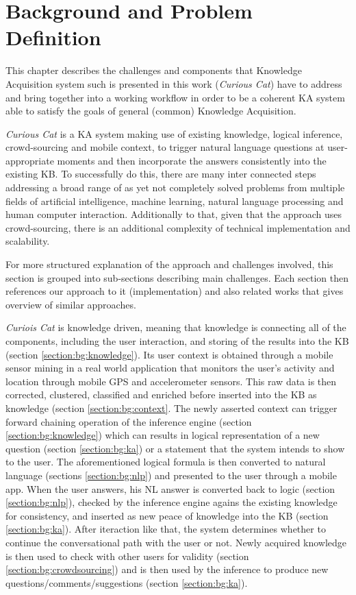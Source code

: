 %
\chapter{Background and Problem Definition}
\label{chapter:background}
This chapter describes the challenges and components that Knowledge Acquisition 
system such is presented in this work (\emph{Curious Cat}) have to address and 
bring together into a working workflow in order to be a coherent KA system able 
to satisfy the goals of general (common) Knowledge Acquisition. 

\emph{Curious Cat} is a KA system making use of existing knowledge, 
logical inference, crowd-sourcing and mobile context, to trigger natural language
questions at user-appropriate moments and then incorporate the answers consistently
into the existing KB. To successfully do this, there are many inter connected
steps addressing a broad range of as yet not completely solved problems from
multiple fields of artificial intelligence, machine learning, natural language
processing and human computer interaction. Additionally to that, given
that the approach uses crowd-sourcing, there is an additional complexity
of technical implementation and scalability. 

For more structured explanation of the approach and challenges involved, this
section is grouped into sub-sections describing main challenges. Each section
then references our approach to it (implementation) and also related works that
gives overview of similar approaches.

\emph{Curiois Cat} is knowledge driven, meaning that knowledge is connecting
all of the components, including the user interaction, and storing of the
results into the KB (section \ref{section:bg:knowledge}). Its user context is 
obtained through a mobile sensor mining in a real world application that 
monitors the user’s activity and location through mobile GPS and accelerometer 
sensors. This raw data is then corrected, clustered, classified and enriched 
before inserted into the KB as knowledge (section \ref{section:bg:context}.
The newly asserted context can trigger forward chaining operation of the 
inference engine (section \ref{section:bg:knowledge}) which can results in
logical representation of a new question (section \ref{section:bg:ka}) or a 
statement that the system intends to show to the user. The aforementioned  
logical formula is then converted to natural language (sections 
\ref{section:bg:nlp}) and presented to the user through a mobile app. 
When the user answers, his NL answer is converted back to logic 
(section \ref{section:bg:nlp}), checked by the inference engine agains the 
existing knowledge for consistency, and inserted as new peace of knowledge into 
the KB (section \ref{section:bg:ka}). After iteraction like that, the
system determines whether to continue the conversational path with the user or
 not. Newly acquired knowledge is then used to check with other users for
validity (section \ref{section:bg:crowdsourcing}) and is then used by the 
inference to produce new questions/comments/suggestions (section 
\ref{section:bg:ka}).

